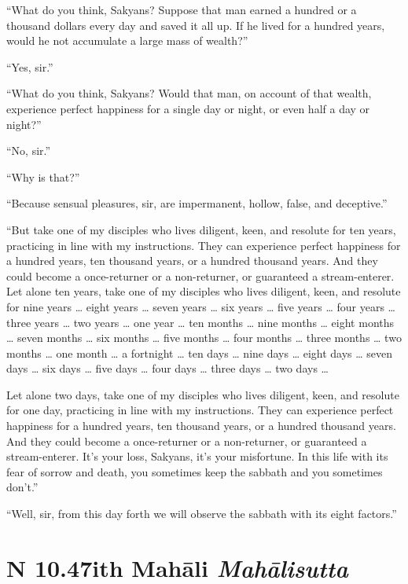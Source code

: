 \documentclass[12pt,openany]{book}%
\newcommand*{\suttatitleacronym}[1]{\smaller[2]{#1}\vspace*{.3em}}
\newcommand*{\suttatitletranslation}[1]{\linebreak{#1}}
\newcommand*{\suttatitleroot}[1]{\linebreak\smaller[2]\itshape{#1}}
\newcommand*{\tocacronym}[1]{\hspace*{-3.3em}{#1}\quad}
\newcommand*{\toctranslation}[1]{#1}
\newcommand*{\tocroot}[1]{(\textit{#1})}
\begin{document}
“What do you think, Sakyans? Suppose that man earned a hundred or a thousand dollars every day and saved it all up. If he lived for a hundred years, would he not accumulate a large mass of wealth?” 

“Yes, sir.” 

“What do you think, Sakyans? Would that man, on account of that wealth, experience perfect happiness for a single day or night, or even half a day or night?” 

“No, sir.” 

“Why is that?” 

“Because sensual pleasures, sir, are impermanent, hollow, false, and deceptive.” 

“But take one of my disciples who lives diligent, keen, and resolute for ten years, practicing in line with my instructions. They can experience perfect happiness for a hundred years, ten thousand years, or a hundred thousand years. And they could become a once-returner or a non-returner, or guaranteed a stream-enterer. Let alone ten years, take one of my disciples who lives diligent, keen, and resolute for nine years … eight years … seven years … six years … five years … four years … three years … two years … one year … ten months … nine months … eight months … seven months … six months … five months … four months … three months … two months … one month … a fortnight … ten days … nine days … eight days … seven days … six days … five days … four days … three days … two days … 

Let alone two days, take one of my disciples who lives diligent, keen, and resolute for one day, practicing in line with my instructions. They can experience perfect happiness for a hundred years, ten thousand years, or a hundred thousand years. And they could become a once-returner or a non-returner, or guaranteed a stream-enterer. It’s your loss, Sakyans, it’s your misfortune. In this life with its fear of sorrow and death, you sometimes keep the sabbath and you sometimes don’t.” 

“Well, sir, from this day forth we will observe the sabbath with its eight factors.” 

%
\section*{{\suttatitleacronym AN 10.47}{\suttatitletranslation With Mahāli }{\suttatitleroot Mahālisutta}}
\addcontentsline{toc}{section}{\tocacronym{AN 10.47} \toctranslation{With Mahāli } \tocroot{Mahālisutta}}
\end{document}
